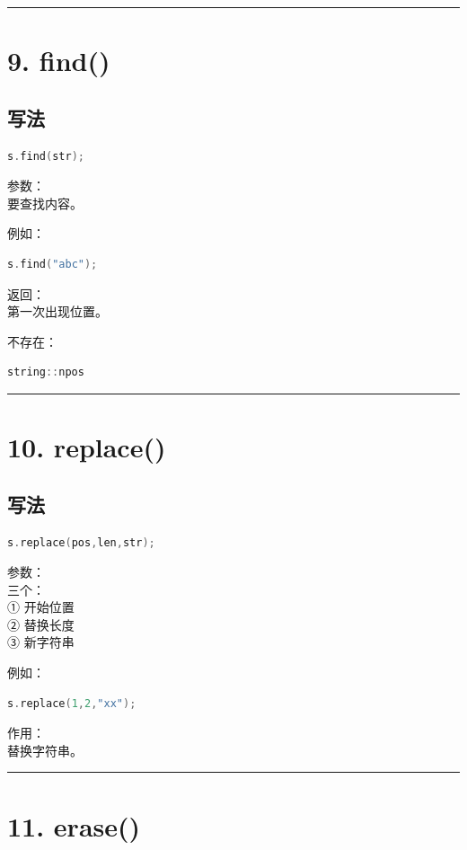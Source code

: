 \documentclass[9pt,twocolumn]{extarticle}
\begin{document}
\noindent\rule{\linewidth}{0.4pt}

\section{9. find()}

\subsection{写法}
\begin{lstlisting}[language=C++]
s.find(str);
\end{lstlisting}
参数：\\
要查找内容。

例如：
\begin{lstlisting}[language=C++]
s.find("abc");
\end{lstlisting}
返回：\\
第一次出现位置。

不存在：
\begin{lstlisting}[language=C++]
string::npos
\end{lstlisting}

\noindent\rule{\linewidth}{0.4pt}

\section{10. replace()}

\subsection{写法}
\begin{lstlisting}[language=C++]
s.replace(pos,len,str);
\end{lstlisting}
参数：\\
三个：\\
① 开始位置\\
② 替换长度\\
③ 新字符串

例如：
\begin{lstlisting}[language=C++]
s.replace(1,2,"xx");
\end{lstlisting}
作用：\\
替换字符串。

\noindent\rule{\linewidth}{0.4pt}

\section{11. erase()}
\end{document}
